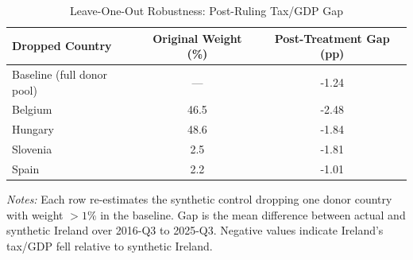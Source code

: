 \begin{table}[H]
\centering
\caption{Leave-One-Out Robustness: Post-Ruling Tax/GDP Gap}
\label{tab:loo}
\begin{threeparttable}
\begin{tabular}{lcc}
\toprule
Dropped Country & Original Weight (\%) & Post-Treatment Gap (pp) \\
\midrule
    Baseline (full donor pool) & --- & -1.24 \\
\midrule
    Belgium & 46.5 & -2.48 \\
    Hungary & 48.6 & -1.84 \\
    Slovenia & 2.5 & -1.81 \\
    Spain & 2.2 & -1.01 \\
\bottomrule
\end{tabular}
\begin{tablenotes}[flushleft]
\small
\item \textit{Notes:} Each row re-estimates the synthetic control dropping one donor country with weight $> 1\%$ in the baseline. Gap is the mean difference between actual and synthetic Ireland over 2016-Q3 to 2025-Q3. Negative values indicate Ireland's tax/GDP fell relative to synthetic Ireland.
\end{tablenotes}
\end{threeparttable}
\end{table}
